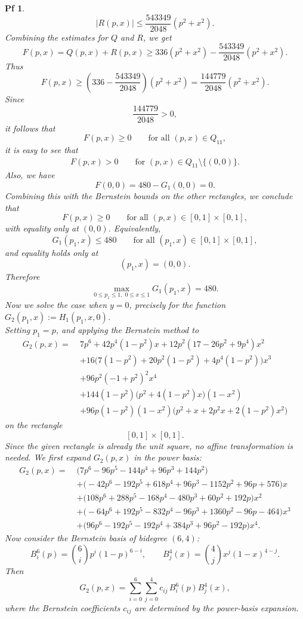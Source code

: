 \documentclass[10pt,a4paper]{amsart}
\newtheorem{pf}{Pf}
\begin{document}
\begin{pf}
\[
|R(p,x)|\le \frac{543349}{2048}(p^2+x^2).
\]
Combining the estimates for $Q$ and $R$, we get
\[
F(p,x)=Q(p,x)+R(p,x)
\ge 336(p^2+x^2)-\frac{543349}{2048}(p^2+x^2).
\]
Thus
\[
F(p,x)\ge
\left(336-\frac{543349}{2048}\right)(p^2+x^2)
=
\frac{144779}{2048}(p^2+x^2).
\]
Since
\[
\frac{144779}{2048}>0,
\]
it follows that
\[
F(p,x)\ge 0
\qquad \text{for all }(p,x)\in Q_{11},
\]
it is easy to see that
\begin{align*}
F(p,x)>0
\qquad \text{for }(p,x)\in Q_{11}\setminus\{(0,0)\}.
\end{align*}
Also, we have
\[
F(0,0)=480-G_1(0,0)=0.
\]
Combining this with the Bernstein bounds on the other rectangles, we conclude that
\[
F(p,x)\ge 0
\qquad \text{for all }(p,x)\in[0, 1]\times[0, 1],
\]
with equality only at \((0,0)\).
Equivalently,
\[
G_1(p_1,x)\le 480
\qquad \text{for all }(p_1,x)\in[0, 1]\times[0, 1],
\]
and equality holds only at
\[
(p_1,x)=(0,0).
\]
Therefore
\[
\max_{0\le p_1\le 1,\;0\le x\le 1}G_1(p_1,x)=480.
\]
Now we solve the case when 
$y=0$, precisely for the function $G_{2}(p_1, x):=H_{1}(p_1, x, 0)$.\\[2mm]
Setting $p_{1}=p$, and applying the Bernstein method to
\[
\begin{aligned}
G_2(p,x)=\;&7 p^6 + 42 p^4 (1-p^2)x + 12 p^2(17-26p^2+9p^4)x^2 \\
&+16\bigl(7(1-p^2)+20p^2(1-p^2)+4p^4(1-p^2)\bigr)x^3 \\
&+96p^2(-1+p^2)^2x^4 \\
&+144(1-p^2)\bigl(p^2+4(1-p^2)x\bigr)(1-x^2) \\
&+96p(1-p^2)(1-x^2)\bigl(p^2+x+2p^2x+2(1-p^2)x^2\bigr)
\end{aligned}
\]
on the rectangle
\[
[0,1]\times[0,1].
\]
Since the given rectangle is already the unit square, no affine transformation is needed. We first expand \(G_2(p,x)\) in the power basis:
\[
\begin{aligned}
G_2(p,x)=\;&\bigl(7p^6-96p^5-144p^4+96p^3+144p^2\bigr) \\
&+\bigl(-42p^6-192p^5+618p^4+96p^3-1152p^2+96p+576\bigr)x \\
&+\bigl(108p^6+288p^5-168p^4-480p^3+60p^2+192p\bigr)x^2 \\
&+\bigl(-64p^6+192p^5-832p^4-96p^3+1360p^2-96p-464\bigr)x^3 \\
&+\bigl(96p^6-192p^5-192p^4+384p^3+96p^2-192p\bigr)x^4.
\end{aligned}
\]
Now consider the Bernstein basis of bidegree \((6,4)\):
\[
B_i^6(p)=\binom{6}{i}p^i(1-p)^{6-i},
\qquad
B_j^4(x)=\binom{4}{j}x^j(1-x)^{4-j}.
\]
Then
\[
G_2(p,x)=\sum_{i=0}^{6}\sum_{j=0}^{4} c_{ij}\,B_i^6(p)B_j^4(x),
\]
where the Bernstein coefficients \(c_{ij}\) are determined by the power-basis expansion.


\end{pf}
\end{document}
